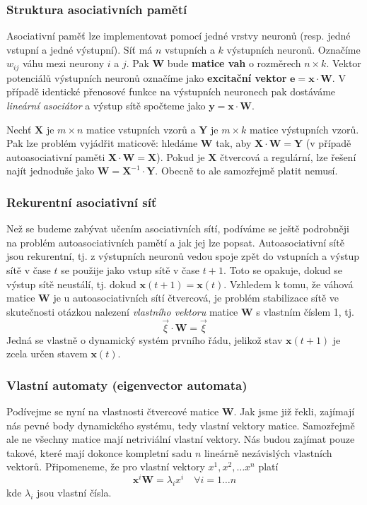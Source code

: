 \documentclass[11pt]{report} %
\renewcommand{\vec}[1]{\mathbf{#1}}
\begin{document}
\subsubsection{Struktura asociativních pamětí}
Asociativní paměť lze implementovat pomocí jedné vrstvy neuronů (resp. jedné vstupní a jedné výstupní). Síť má $n$ vstupních a $k$ výstupních neuronů. Označíme $w_{ij}$ váhu mezi neurony $i$ a $j$. Pak $\vec{W}$ bude \textbf{matice vah} o rozměrech $n \times k$. Vektor potenciálů výstupních neuronů označíme jako \textbf{excitační vektor} $\vec{e} = \vec{x}\cdot \vec{W}$. V případě identické přenosové funkce na výstupních neuronech pak dostáváme \textit{lineární asociátor} a výstup sítě spočteme jako $\vec{y} = \vec{x} \cdot \vec{W}$.

Nechť $\vec{X}$ je $m \times n$ matice vstupních vzorů a $\vec{Y}$ je $m \times k$ matice výstupních vzorů. Pak lze problém vyjádřit maticově: hledáme $\vec{W}$ tak, aby $\vec{X}\cdot \vec{W} = \vec{Y}$ (v případě autoasociativní paměti $\vec{X}\cdot \vec{W} = \vec{X}$). Pokud je $\vec{X}$ čtvercová a regulární, lze řešení najít jednoduše jako $\vec{W} = \vec{X}^{-1} \cdot \vec{Y}$. Obecně to ale samozřejmě platit nemusí.

\subsubsection{Rekurentní asociativní síť}
Než se budeme zabývat učením asociativních sítí, podíváme se ještě podrobněji na problém autoasociativních pamětí a jak jej lze popsat. Autoasociativní sítě jsou rekurentní, tj. z výstupních neuronů vedou spoje zpět do vstupních a výstup sítě v čase $t$ se použije jako vstup sítě v čase $t+1$. Toto se opakuje, dokud se výstup sítě neustálí, tj. dokud $\vec{x}(t+1) = \vec{x}(t)$. Vzhledem k tomu, že váhová matice $\vec{W}$ je u autoasociativních sítí čtvercová, je problém stabilizace sítě ve skutečnosti otázkou nalezení \textit{vlastního vektoru} matice $\vec{W}$ s vlastním číslem 1, tj. 
$$\overrightarrow{\xi} \cdot \vec{W} = \overrightarrow{\xi}$$
Jedná se vlastně o dynamický systém prvního řádu, jelikož stav $\vec{x}(t+1)$ je zcela určen stavem $\vec{x}(t)$.

\subsubsection{Vlastní automaty (eigenvector automata)}
Podívejme se nyní na vlastnosti čtvercové matice $\vec{W}$. Jak jsme již řekli, zajímají nás pevné body dynamického systému, tedy vlastní vektory matice. Samozřejmě ale ne všechny matice mají netriviální vlastní vektory. Nás budou zajímat pouze takové, které mají dokonce kompletní sadu $n$ lineárně nezávislých vlastních vektorů. Připomeneme, že pro vlastní vektory $x^1, x^2, \dots x^n$ platí
$$
\vec{x}^i\vec{W} = \lambda_i x^i \quad \forall i = 1 \dots n
$$
kde $\lambda_i$ jsou vlastní čísla.
\end{document}
